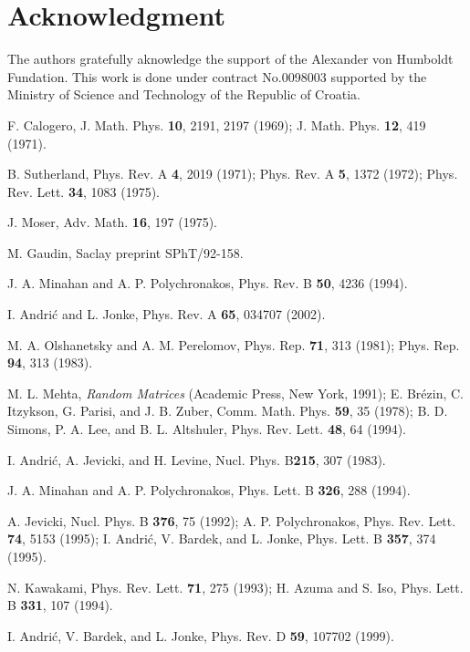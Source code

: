 \documentclass[a4paper,preprint,aps]{revtex4}
\def\Journal#1#2#3#4{{#1}{\bf #2},#3 (#4)}
\def\prd{{ Phys. Rev.} D}
\def\pra{{ Phys. Rev.} A}
\def\prb{{ Phys. Rev.} B}
\def\npb{{ Nucl. Phys.} B}
\def\prl{ Phys. Rev. Lett.}
\def\cmp{ Comm. Math. Phys.}
\def\plb{{ Phys. Lett.} B}
\begin{document}
\section*{ Acknowledgment}

The authors gratefully aknowledge the support of the Alexander von
 Humboldt Fundation.
This work is done under contract No.0098003 supported by the Ministry of 
Science and Technology of the Republic of Croatia.





\begin{thebibliography}{99}

F. Calogero, {J. Math. Phys.} {\bf 10}, 2191, 2197 (1969);
{J. Math. Phys.} {\bf 12}, 419 (1971).

B. Sutherland, \Journal{\pra}{ 4}{ 2019} {1971}; \Journal{\pra}{ 5}{ 1372} 
{1972}; \Journal{\prl}{ 34}{ 1083} {1975}.

J. Moser, {Adv. Math.} {\bf 16}, 197 (1975).

M. Gaudin, Saclay preprint SPhT/92-158.

J. A. Minahan and A. P. Polychronakos, \Journal{\prb}{ 50}{ 4236}{1994}.

I. Andri\' c and L. Jonke, \Journal{\pra}{ 65}{ 034707}{2002}.

M. A. Olshanetsky and A. M. Perelomov, {Phys. Rep.} {\bf 71}, 313 (1981);
 {Phys. Rep.} {\bf 94}, 313 (1983).

M. L. Mehta, {\em Random Matrices} (Academic Press, New York, 1991); 
E. Br\'ezin, C. Itzykson, G. Parisi, and J. B. Zuber, \Journal{\cmp}{ 59}{ 35} 
{1978}; B. D. Simons, P. A. Lee, and B. L. Altshuler, \Journal{\prl}{ 48}{ 64} 
{1994}.

I. Andri\'{c}, A. Jevicki, and H. Levine, \Journal{\npb}{215}{ 307}{1983}.

J. A. Minahan and A. P. Polychronakos, \Journal{\plb}{ 326}{ 288}{1994}.

A. Jevicki, \Journal{\npb}{ 376}{ 75}{1992};
 A. P. Polychronakos, \Journal{\prl}{ 74}{ 5153}{1995};
 I. Andri\'{c}, V. Bardek, and L. Jonke, \Journal{\plb}{ 357}{ 374}{1995}.

N. Kawakami, \Journal{\prl}{ 71}{ 275}{1993}; H. Azuma and S. Iso, 
\Journal{\plb}{ 331}{ 107}{1994}.

I. Andri\'c, V. Bardek, and L. Jonke, \Journal{\prd}{ 59}{ 107702}{1999}.


\end{thebibliography}
\end{document}
